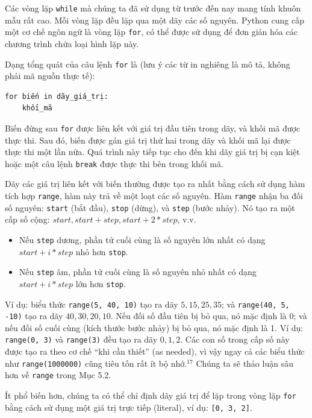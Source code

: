 \noindent \indent Các vòng lặp \texttt{while} mà chúng ta đã sử dụng từ trước đến nay mang tính khuôn mẫu rất cao. Mỗi vòng lặp đều lặp qua một dãy các số nguyên. Python cung cấp một cơ chế ngôn ngữ là vòng lặp \texttt{for}, có thể được sử dụng để đơn giản hóa các chương trình chứa loại hình lặp này.

Dạng tổng quát của câu lệnh \texttt{for} là (lưu ý các từ in nghiêng là mô tả, không phải mã nguồn thực tế):

\begin{verbatim}
for biến in dãy_giá_trị:
    khối_mã
\end{verbatim}

Biến đứng sau \texttt{for} được liên kết với giá trị đầu tiên trong dãy, và khối mã được thực thi. Sau đó, biến được gán giá trị thứ hai trong dãy và khối mã lại được thực thi một lần nữa. Quá trình này tiếp tục cho đến khi dãy giá trị bị cạn kiệt hoặc một câu lệnh \texttt{break} được thực thi bên trong khối mã.

Dãy các giá trị liên kết với biến thường được tạo ra nhất bằng cách sử dụng hàm tích hợp \texttt{range}, hàm này trả về một loạt các số nguyên. Hàm \texttt{range} nhận ba đối số nguyên: \texttt{start} (bắt đầu), \texttt{stop} (dừng), và \texttt{step} (bước nhảy). Nó tạo ra một cấp số cộng: $start, start + step, start + 2*step$, v.v.

\begin{itemize}
    \item Nếu \texttt{step} dương, phần tử cuối cùng là số nguyên lớn nhất có dạng $start + i*step$ nhỏ hơn \texttt{stop}.
    \item Nếu \texttt{step} âm, phần tử cuối cùng là số nguyên nhỏ nhất có dạng $start + i*step$ lớn hơn \texttt{stop}.
\end{itemize}

Ví dụ: biểu thức \texttt{range(5, 40, 10)} tạo ra dãy $5, 15, 25, 35$; và \texttt{range(40, 5, -10)} tạo ra dãy $40, 30, 20, 10$. Nếu đối số đầu tiên bị bỏ qua, nó mặc định là 0; và nếu đối số cuối cùng (kích thước bước nhảy) bị bỏ qua, nó mặc định là 1. Ví dụ: \texttt{range(0, 3)} và \texttt{range(3)} đều tạo ra dãy $0, 1, 2$. Các con số trong cấp số này được tạo ra theo cơ chế ``khi cần thiết'' (as needed), vì vậy ngay cả các biểu thức như \texttt{range(1000000)} cũng tiêu tốn rất ít bộ nhớ.$^{17}$ Chúng ta sẽ thảo luận sâu hơn về \texttt{range} trong Mục 5.2.

Ít phổ biến hơn, chúng ta có thể chỉ định dãy giá trị để lặp trong vòng lặp \texttt{for} bằng cách sử dụng một giá trị trực tiếp (literal), ví dụ: \texttt{[0, 3, 2]}.

